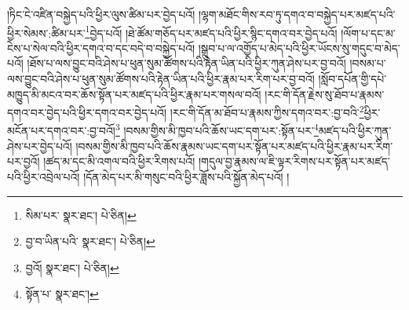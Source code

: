 །ཏིང་ངེ་འཛིན་བསྐྱེད་པའི་ཕྱིར་ལུས་ཚིམ་པར་བྱེད་པའོ། །ལྷག་མཐོང་གིས་རབ་ཏུ་དགའ་བ་བསྐྱེད་པར་མཛད་པའི་ཕྱིར་སེམས་:ཚིམ་པར་\footnote{སིམ་པར་  སྣར་ཐང་།  པེ་ཅིན། }བྱེད་པའོ། །ཐེ་ཚོམ་གཅོད་པར་མཛད་པའི་ཕྱིར་སྙིང་དགའ་བར་བྱེད་པའོ། །ལོག་པ་དང་མ་ངེས་པ་སེལ་བའི་ཕྱིར་དགའ་བ་དང་བདེ་བ་བསྐྱེད་པའོ། །སྒྲུབ་པ་ལ་འགྱོད་པ་མེད་པའི་ཕྱིར་ཡོངས་སུ་གདུང་བ་མེད་པའོ། །ཐོས་པ་ལས་བྱུང་བའི་ཤེས་པ་ཕུན་སུམ་ཚོགས་པའི་རྟེན་ཡིན་པའི་ཕྱིར་ཀུན་ཤེས་པར་བྱ་བའོ། །བསམ་པ་ལས་བྱུང་བའི་ཤེས་པ་ཕུན་སུམ་ཚོགས་པའི་རྟེན་ཡིན་པའི་ཕྱིར་རྣམ་པར་རིག་པར་བྱ་བའོ། །སློབ་དཔོན་གྱི་དཔེ་མཁྱུད་མི་མངའ་བར་ཆོས་སྟོན་པར་མཛད་པའི་ཕྱིར་རྣམ་པར་གསལ་བའོ། །རང་གི་དོན་རྗེས་སུ་ཐོབ་པ་རྣམས་དགའ་བར་བྱེད་པའི་ཕྱིར་དགའ་བར་བྱེད་པའོ། །རང་གི་དོན་མ་ཐོབ་པ་རྣམས་ཀྱིས་དགའ་བར་:བྱ་བའི་\footnote{བྱ་བ་ཡིན་པའི་  སྣར་ཐང་།  པེ་ཅིན། }ཕྱིར་མངོན་པར་དགའ་བར་:བྱ་བའོ།\footnote{བྱའོ།  སྣར་ཐང་།  པེ་ཅིན། } །བསམ་གྱིས་མི་ཁྱབ་པའི་ཆོས་ཡང་དག་པར་:སྟོན་པར་\footnote{སྟོན་པ་  སྣར་ཐང་། }མཛད་པའི་ཕྱིར་ཀུན་ཤེས་པར་བྱེད་པའོ། །བསམ་གྱིས་མི་ཁྱབ་པའི་ཆོས་རྣམས་ཡང་དག་པར་སྟོན་པར་མཛད་པའི་ཕྱིར་རྣམ་པར་རིག་པར་བྱའོ། །ཚད་མ་དང་མི་འགལ་བའི་ཕྱིར་རིགས་པའོ། །གདུལ་བྱ་རྣམས་ལ་ཇི་ལྟར་རིགས་པར་སྟོན་པར་མཛད་པའི་ཕྱིར་འབྲེལ་པའོ། །དོན་མེད་པར་མི་གསུང་བའི་ཕྱིར་ཟློས་པའི་སྐྱོན་མེད་པའོ། །
